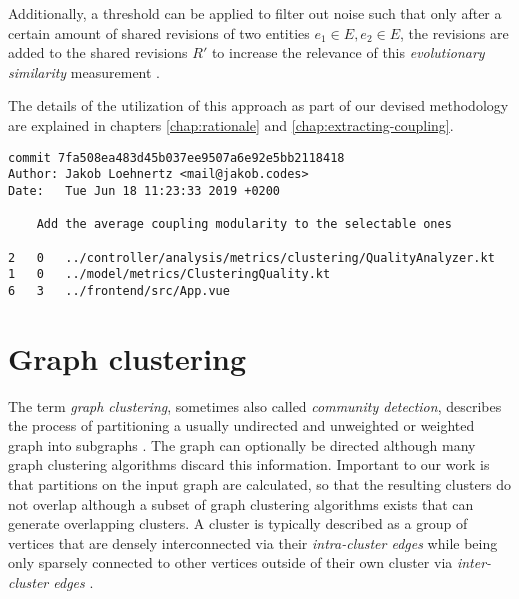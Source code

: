 \documentclass[12pt,a4paper]{report}
\begin{document}
Additionally, a threshold can be applied to filter out noise such that only
after a certain amount of shared revisions of two entities \(e_1 \in E, e_2 \in E\),
the revisions are added to the shared revisions \(R'\) to increase the relevance
of this \textit{evolutionary similarity} measurement \cite{tornhill2015crimescene}.

The details of the utilization of this approach as part of our devised methodology
are explained in chapters \ref{chap:rationale} and \ref{chap:extracting-coupling}.

\smaller
\begin{lstlisting}[caption=Example Git log, label=git-log, breaklines=true]
commit 7fa508ea483d45b037ee9507a6e92e5bb2118418
Author: Jakob Loehnertz <mail@jakob.codes>
Date:   Tue Jun 18 11:23:33 2019 +0200

    Add the average coupling modularity to the selectable ones

2   0   ../controller/analysis/metrics/clustering/QualityAnalyzer.kt
1   0   ../model/metrics/ClusteringQuality.kt
6   3   ../frontend/src/App.vue
\end{lstlisting}
\normalsize



\section{Graph clustering} \label{sect:background-graph-clustering}

The term \textit{graph clustering}, sometimes also called \textit{community detection},
describes the process of partitioning a usually undirected
and unweighted or weighted graph into subgraphs \cite{lancichinetti2009community}.
The graph can optionally be directed although many graph clustering algorithms discard this information.
Important to our work is that partitions on the input graph are calculated,
so that the resulting clusters do not overlap although a subset of
graph clustering algorithms exists that can generate overlapping clusters.
A cluster is typically described as a group of vertices that are densely
interconnected via their \textit{intra-cluster edges} while being only sparsely
connected to other vertices outside of their own cluster via
\textit{inter-cluster edges} \cite{lancichinetti2009community, newman2004fast}.
\end{document}
